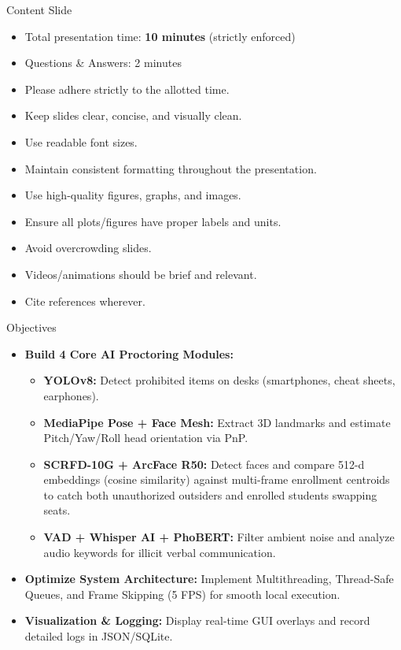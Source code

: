 \documentclass[aspectratio=169, 10pt]{beamer}
\begin{document}
\begin{frame}{Content Slide}
  \begin{itemize}
      \item Total presentation time: \textbf{10 minutes} (strictly enforced)
      \item Questions \& Answers: 2 minutes
      \item Please adhere strictly to the allotted time.
      \item Keep slides clear, concise, and visually clean.
      \item Use readable font sizes.
      \item Maintain consistent formatting throughout the presentation.
      \item Use high-quality figures, graphs, and images.
      \item Ensure all plots/figures have proper labels and units.
      \item Avoid overcrowding slides.
      \item Videos/animations should be brief and relevant.
      \item Cite references wherever.
  \end{itemize}
\end{frame}

\begin{frame}{Objectives}
\begin{itemize}
    \item \textbf{Build 4 Core AI Proctoring Modules:}
    \begin{itemize}
        \item \textbf{YOLOv8:} Detect prohibited items on desks (smartphones, cheat sheets, earphones).
        \item \textbf{MediaPipe Pose + Face Mesh:} Extract 3D landmarks and estimate Pitch/Yaw/Roll head orientation via PnP.
        \item \textbf{SCRFD-10G + ArcFace R50:} Detect faces and compare 512-d embeddings (cosine similarity) against multi-frame enrollment centroids to catch both unauthorized outsiders and enrolled students swapping seats.
        \item \textbf{VAD + Whisper AI + PhoBERT:} Filter ambient noise and analyze audio keywords for illicit verbal communication.
    \end{itemize}
    \item \textbf{Optimize System Architecture:} Implement Multithreading, Thread-Safe Queues, and Frame Skipping (5 FPS) for smooth local execution.
    \item \textbf{Visualization \& Logging:} Display real-time GUI overlays and record detailed logs in JSON/SQLite.
\end{itemize}
\end{frame}
\end{document}
